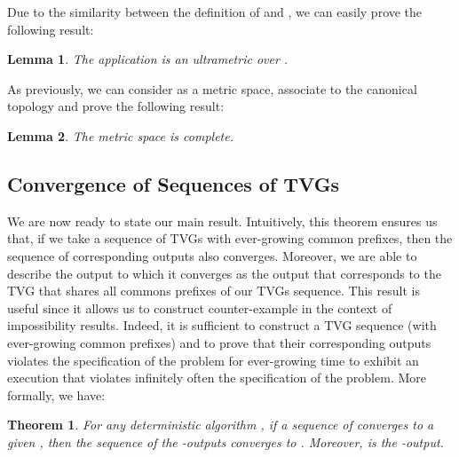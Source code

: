 \documentclass[11pt]{article}
\newtheorem{theorem}{Theorem}
\newtheorem{lemma}{Lemma}
\begin{document}
Due to the similarity between the definition of  and , we can easily prove the following result:

\begin{lemma}\label{lem:doultrametric}
The application  is an ultrametric over .
\end{lemma} 

As previously, we can consider  as a metric space, associate to  the canonical topology and prove the following result:

\begin{lemma}\label{lem:ocomplete}
The metric space  is complete.
\end{lemma} 

\subsection{Convergence of Sequences of TVGs}\label{sub:convergence}

We are now ready to state our main result. Intuitively, this theorem ensures us that, if we take a sequence of TVGs with ever-growing common prefixes, then the sequence of corresponding outputs also converges. Moreover, we are able to describe the output to which it converges as the output that corresponds to the TVG that shares all commons prefixes of our TVGs sequence. This result is useful since it allows us to construct counter-example in the context of impossibility results. Indeed, it is sufficient to construct a TVG sequence (with ever-growing common prefixes) and to prove that their corresponding outputs violates the specification of the problem for ever-growing time to exhibit an execution that violates infinitely often the specification of the problem. More formally, we have:
 
\begin{theorem}\label{th:main}
For any deterministic algorithm , if a sequence  of  converges to a given , then the sequence  of the -outputs converges to . Moreover,  is the -output.
\end{theorem}
\end{document}
